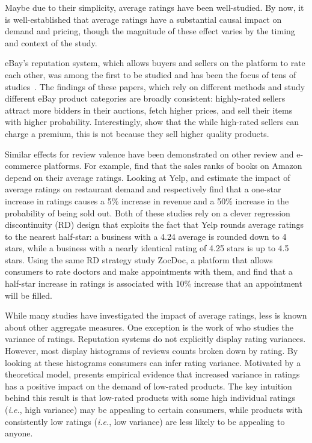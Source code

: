 \documentclass[letter,12pt]{article}
\begin{document}
Maybe due to their simplicity, average ratings have been well-studied. By now,
it is well-established that average ratings have a substantial causal impact
on demand and pricing, though the magnitude of these effect varies by the
timing and context of the study.

eBay's reputation system, which allows buyers and sellers on the platform to
rate each other, was among the first to be studied and has been the focus of
tens of studies~\citep{ba2002evidence,houser2006reputation,lucking2007pennies,eaton2002value,bajari2003winner,kalyanam2001return,mcdonald2002reputation,cabral2010dynamics,dewally2006reputation,jin2006price}. 
The findings of these papers, which rely on different methods and study
different eBay product categories are broadly consistent: highly-rated sellers
attract more bidders in their auctions, fetch higher prices, and sell their
items with higher probability. Interestingly, \citet{jin2006price} show that
the while high-rated sellers can charge a premium, this is not because they
sell higher quality products.

Similar effects for review valence have been demonstrated on other review and
e-commerce platforms. For example, \citet{chevalier2006effect} find that the
sales ranks of books on Amazon depend on their average ratings. Looking at
Yelp, \citet{luca2016reviews} and \citet{anderson2012learning} estimate the
impact of average ratings on restaurant demand and respectively find that a
one-star increase in ratings causes a 5\% increase in revenue and a 50\%
increase in the probability of being sold out. Both of these studies rely on a
clever regression discontinuity (RD) design that exploits the fact that Yelp
rounds average ratings to the nearest half-star: a business with a 4.24
average is rounded down to 4 stars, while a business with a nearly identical
rating of 4.25 stars is up to 4.5 stars. Using the same RD strategy
\citet{luca2013digitizing} study ZocDoc, a platform that allows consumers to
rate doctors and make appointments with them, and find that a half-star
increase in ratings is associated with 10\% increase that an appointment will
be filled.

While many studies have investigated the impact of average ratings, less is
known about other aggregate measures. One exception is the work of
\citet{sun2012variance} who studies the variance of ratings. Reputation
systems do not explicitly display rating variances. However, most display
histograms of reviews counts broken down by rating. By looking at these
histograms consumers can infer rating variance. Motivated by a theoretical
model, \citet{sun2012variance} presents empirical evidence that increased
variance in ratings has a positive impact on the demand of low-rated products.
The key intuition behind this result is that low-rated products with some high
individual ratings (\emph{i.e.}, high variance) may be appealing to certain
consumers, while products with consistently low ratings (\emph{i.e.}, low
variance) are less likely to be appealing to anyone.
\end{document}
